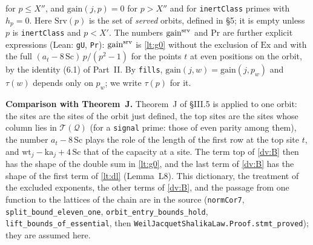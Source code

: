 \documentclass[11pt,letterpaper]{article}
\begin{document}
for $p\le X''$, and $\mathrm{gain}(j,p)=0$ for $p>X''$ and for \texttt{inertClass} primes with $h_p=0$.
Here $\mathrm{Srv}(p)$ is the set of \emph{served} orbits, defined in \S5; it is empty unless $p$ is
\texttt{inertClass} and $p<X'$. The numbers $\mathrm{gain}^{\rm srv}$ and $\mathrm{Pr}$ are further
explicit expressions (Lean: \texttt{gU}, \texttt{Pr}): $\mathrm{gain}^{\rm srv}$ is \eqref{lt:g0} without
the exclusion of $\mathrm{Ex}$ and with the full $(a_t-8\,\mathrm{Sc})\,p/(p^2-1)$ for the points $t$ at
even positions on the orbit, by the identity (6.1) of Part~II. By \texttt{fills},
$\mathrm{gain}(j,w)=\mathrm{gain}(j,p_w)$ and $\tau(w)$ depends only on $p_w$; we write $\tau(p)$ for it.

\textbf{Comparison with Theorem~J.} Theorem~J of \S III.5 is applied to one orbit: the sites are the
sites of the orbit just defined, the top sites are the sites whose column lies in $\mathcal T(\mathcal Q)$
(for a \texttt{signal} prime: those of even parity among them), the number
$a_t-8\,\mathrm{Sc}$ plays the role of the length of the first row at the top site $t$, and
$\mathrm{wt}_j-\mathrm{ka}_j+4\,\mathrm{Sc}$ that of the capacity at a site. The term $\mathrm{top}$ of
\eqref{dv:B} then has the shape of the double sum in \eqref{lt:g0}, and the last term of \eqref{dv:B} has
the shape of the first term of \eqref{lt:dl} (Lemma~L8). This dictionary, the treatment of the excluded
exponents, the other terms of \eqref{dv:B}, and the passage from one function to the lattices of the
chain are in the source (\texttt{normCor7}, \texttt{split\_bound\_eleven\_one},
\texttt{orbit\_entry\_bounds\_hold}, \texttt{lift\_bounds\_of\_essential}, then
\texttt{WeilJacquetShalikaLaw.Proof.stmt\_proved}); they are assumed here.
\end{document}
